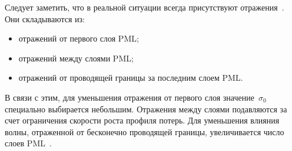 
Следует заметить, что в реальной ситуации всегда присутствуют
отражения~\cite{bib:Berenger1994,bib:Berenger1996}.
Они складываются из:
\begin{itemize}
  \item отражений от первого слоя PML;
  \item отражений между слоями PML;
  \item отражений от проводящей границы за последним слоем PML.
\end{itemize}

\noindent
В связи с этим, для уменьшения отражения от первого слоя значение~$\sigma_0$
специально выбирается небольшим. Отражения между слоями подавляются за счет
ограничения скорости роста профиля потерь. Для уменьшения влияния волны,
отраженной от бесконечно проводящей границы, увеличивается число слоев
PML~\cite{bib:Berenger1996}.

